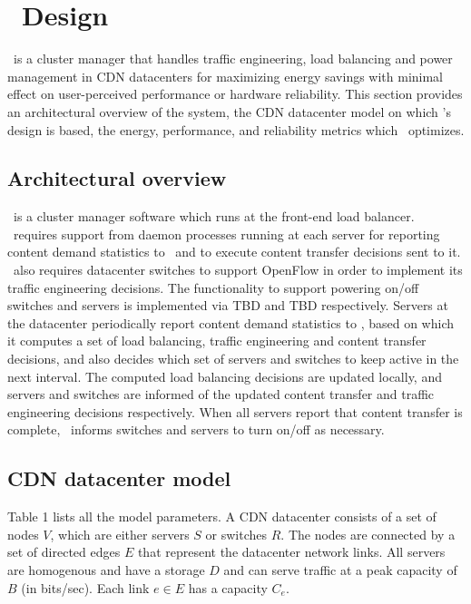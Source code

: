 \section{\shrink\ Design}

\shrink\ is a cluster manager that handles traffic engineering, load balancing and power management in CDN datacenters for maximizing energy savings with minimal effect on user-perceived performance or hardware reliability. This section provides an architectural overview of the system,  the CDN datacenter model on which \shrink's design is based, the energy,  performance, and reliability metrics which \shrink\ optimizes.


\subsection{Architectural overview}

\shrink\ is a cluster manager software which runs at the front-end load balancer. \shrink\ requires support from daemon processes running at each server for reporting content demand statistics to \shrink\ and to execute content transfer decisions sent to it. \shrink\ also requires datacenter switches to support OpenFlow in order to implement its traffic engineering decisions. 
The functionality to support powering on/off switches and servers is implemented via TBD and TBD respectively. Servers at the datacenter periodically report content demand statistics to \shrink, based on which it computes a set of load balancing, traffic engineering and content transfer decisions, and also decides which set of servers and switches to keep active in the next interval. The computed load balancing decisions are updated locally, and servers and switches are informed of the updated content transfer and traffic engineering decisions respectively. When all servers report that content transfer is complete, \shrink\ informs switches and servers to turn on/off as necessary.

\subsection{CDN datacenter model}

Table 1 lists all the model parameters. 
A CDN datacenter consists of a set of nodes $V$, which are either servers $S$ or switches $R$. The nodes are connected by a set of directed edges $E$ that represent the datacenter network links. All servers are homogenous and have a storage  $D$ and can serve traffic at a peak capacity of $B$ (in bits/sec).  Each link $e\in E$ has a capacity  $C_e$.

